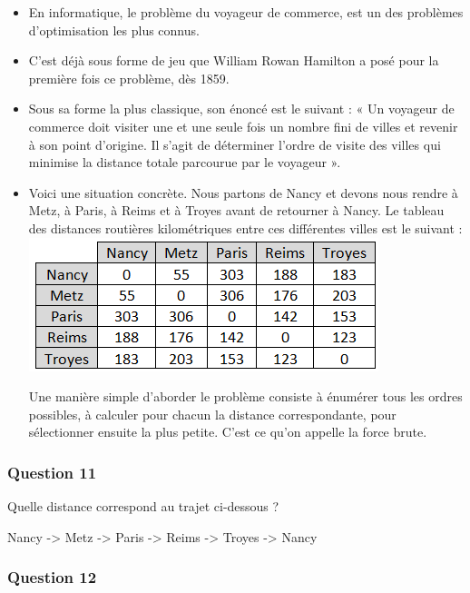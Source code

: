 \documentclass[
  paper=a4,
  ,captions=tableheading
]{scrartcl}
\begin{document}
\begin{itemize}
\item
  En informatique, le problème du voyageur de commerce, est un des
  problèmes d'optimisation les plus connus.
\item
  C'est déjà sous forme de jeu que William Rowan Hamilton a posé pour la
  première fois ce problème, dès 1859.
\item
  Sous sa forme la plus classique, son énoncé est le suivant : « Un
  voyageur de commerce doit visiter une et une seule fois un nombre fini
  de villes et revenir à son point d'origine. Il s'agit de déterminer
  l'ordre de visite des villes qui minimise la distance totale parcourue
  par le voyageur ».
\item
  Voici une situation concrète. Nous partons de Nancy et devons nous
  rendre à Metz, à Paris, à Reims et à Troyes avant de retourner à
  Nancy. Le tableau des distances routières kilométriques entre ces
  différentes villes est le suivant :\\
  \includegraphics{images/5-image.png}

  Une manière simple d'aborder le problème consiste à énumérer tous les
  ordres possibles, à calculer pour chacun la distance correspondante,
  pour sélectionner ensuite la plus petite. C'est ce qu'on appelle la
  force brute.
\end{itemize}

\hypertarget{question-11}{%
\subsubsection{Question 11}\label{question-11}}

Quelle distance correspond au trajet ci-dessous ?

Nancy -\textgreater{} Metz -\textgreater{} Paris -\textgreater{} Reims
-\textgreater{} Troyes -\textgreater{} Nancy

\hypertarget{question-12}{%
\subsubsection{Question 12}\label{question-12}}
\end{document}
